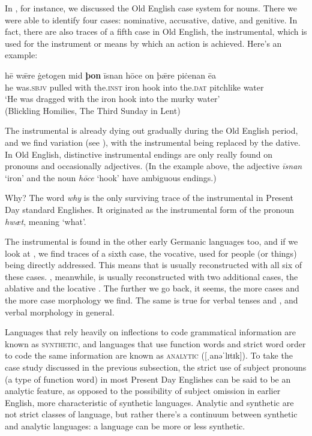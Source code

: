 In , for instance, we discussed the Old English case system for nouns. There we were able to identify four cases: nominative, accusative, dative, and genitive. In fact, there are also traces of a fifth case in Old English, the instrumental, which is used for the instrument or means by which an action is achieved. Here's an example:

\begin{exe}
\ex
\gll hē wǣre ġetogen mid \textbf{þon} īsnan hōce on þǣre piċenan ēa\\
he was.\textsc{sbjv} pulled with the.\textsc{inst} iron hook into the.\textsc{dat} pitchlike water\\
\trans `He was dragged with the iron hook into the murky water'\\
(Blickling Homilies, The Third Sunday in Lent)
\label{blickling-homilies}
\end{exe}

\noindent The instrumental is already dying out gradually during the Old English period, and we find variation (see \citealp{Freeman2018}), with the instrumental being replaced by the dative. In Old English, distinctive instrumental endings are only really found on pronouns and occasionally adjectives. (In the example above, the adjective \emph{īsnan} `iron' and the noun \emph{hōce} `hook' have ambiguous endings.)


\begin{miscbox}{Why?}
The word \emph{why} is the only surviving trace of the instrumental in Present Day standard Englishes. It originated as the instrumental form of the pronoun \emph{hwæt}, meaning `what'.
\end{miscbox}


The instrumental is found in the other early Germanic languages too, and if we look at , we find traces of a sixth case, the vocative, used for people (or things) being directly addressed. This means that  is usually reconstructed with all six of these cases. , meanwhile, is usually reconstructed with two additional cases, the ablative and the locative \citep[90--100]{Clackson2007}. The further we go back, it seems, the more cases and the more case morphology we find. The same is true for verbal tenses and , and verbal morphology in general.

Languages that rely heavily on inflections to code grammatical information are known as \textsc{synthetic}, and languages that use function words and strict word order to code the same information are known as \textsc{analytic} ([ˌanəˈlɪtɪk]). To take the case study discussed in the previous subsection, the strict use of subject pronouns (a type of function word) in most Present Day Englishes can be said to be an analytic feature, as opposed to the possibility of subject omission in earlier English, more characteristic of synthetic languages. Analytic and synthetic are not strict classes of language, but rather there's a continuum between synthetic and analytic languages: a language can be more or less synthetic.

